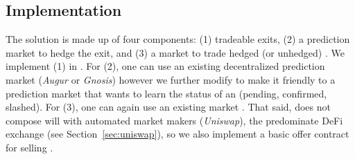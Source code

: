 \subsection{Implementation} 

The solution is made up of four components: (1) tradeable exits, (2) a prediction market to hedge the exit, and (3) a market to trade hedged (or unhedged) \ethxx. We implement (1) in \arb \nitro. For (2), one can use an existing decentralized prediction market (\eg \textit{Augur} or \textit{Gnosis}) however we further modify \arb \nitro to make it friendly to a prediction market that wants to learn the status of an \rblock (pending, confirmed, slashed). For (3), one can again use an existing market . That said, \ethxx does not compose will with automated market makers (\eg \textit{Uniswap}), the predominate DeFi exchange (see Section~\ref{sec:uniswap}), so we also implement a basic offer contract for selling \ethxx.


